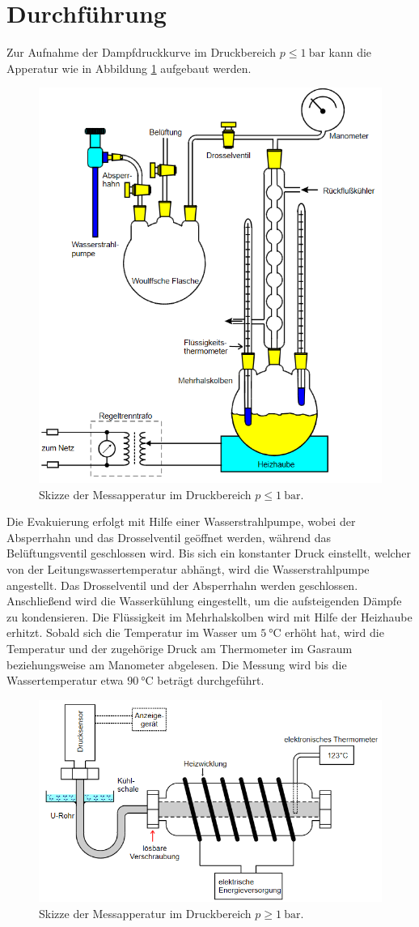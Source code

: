\section{Durchführung}
\label{sec:Durchführung}
Zur Aufnahme der Dampfdruckkurve im Druckbereich $p \leq \SI{1}{\bar}$ kann die Apperatur wie in Abbildung \ref{fig:aufa} aufgebaut werden.
\begin{figure}
    \centering
    \caption{Skizze der Messapperatur im Druckbereich $p\leq \SI{1}{\bar}$.\cite{v203}}
    \label{fig:aufa}
    \includegraphics[width = 0.6 \textwidth]{pics/aufbau.png}
\end{figure}
Die Evakuierung erfolgt mit Hilfe einer Wasserstrahlpumpe, wobei der Absperrhahn und das Drosselventil geöffnet werden, während das Belüftungsventil geschlossen wird.
Bis sich ein konstanter Druck einstellt, welcher von der Leitungswassertemperatur abhängt, wird die Wasserstrahlpumpe angestellt.
Das Drosselventil und der Absperrhahn werden geschlossen.
Anschließend wird die Wasserkühlung eingestellt, um die aufsteigenden Dämpfe zu kondensieren. Die Flüssigkeit im Mehrhalskolben wird mit Hilfe der Heizhaube erhitzt.
Sobald sich die Temperatur im Wasser um $\SI{5}{\celsius}$ erhöht hat, wird die Temperatur und der zugehörige Druck am Thermometer im Gasraum beziehungsweise am Manometer abgelesen.
Die Messung wird bis die Wassertemperatur etwa $\SI{90}{\celsius}$ beträgt durchgeführt.
\begin{figure}
    \centering
    \caption{Skizze der Messapperatur im Druckbereich $p \geq \SI{1}{\bar}$.\cite{v203}}
    \label{fig:aufb}
    \includegraphics[width = 0.6 \textwidth]{pics/aufbaub.png}
\end{figure}
